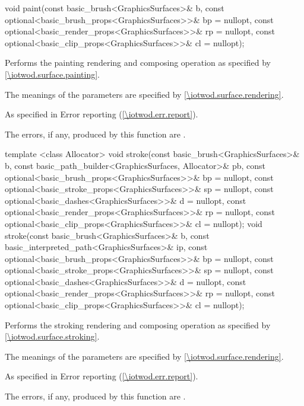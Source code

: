 %
\begin{itemdecl}
void paint(const basic_brush<GraphicsSurfaces>& b,
  const optional<basic_brush_props<GraphicsSurfaces>>& bp = nullopt,
  const optional<basic_render_props<GraphicsSurfaces>>& rp = nullopt,
  const optional<basic_clip_props<GraphicsSurfaces>>& cl = nullopt);
\end{itemdecl}
\begin{itemdescr}
\pnum
\effects
Performs the painting rendering and composing operation as specified by \ref{\iotwod.surface.painting}.

\pnum
The meanings of the parameters are specified by \ref{\iotwod.surface.rendering}.

\pnum
\throws
As specified in Error reporting (\ref{\iotwod.err.report}).

\pnum
\errors
The errors, if any, produced by this function are .
\end{itemdescr}

%
\begin{itemdecl}
template <class Allocator>
void stroke(const basic_brush<GraphicsSurfaces>& b,
  const basic_path_builder<GraphicsSurfaces, Allocator>& pb,
  const optional<basic_brush_props<GraphicsSurfaces>>& bp = nullopt,
  const optional<basic_stroke_props<GraphicsSurfaces>>& sp = nullopt,
  const optional<basic_dashes<GraphicsSurfaces>>& d = nullopt,
  const optional<basic_render_props<GraphicsSurfaces>>& rp = nullopt,
  const optional<basic_clip_props<GraphicsSurfaces>>& cl = nullopt);
void stroke(const basic_brush<GraphicsSurfaces>& b,
  const basic_interpreted_path<GraphicsSurfaces>& ip,
  const optional<basic_brush_props<GraphicsSurfaces>>& bp = nullopt,
  const optional<basic_stroke_props<GraphicsSurfaces>>& sp = nullopt,
  const optional<basic_dashes<GraphicsSurfaces>>& d = nullopt,
  const optional<basic_render_props<GraphicsSurfaces>>& rp = nullopt,
  const optional<basic_clip_props<GraphicsSurfaces>>& cl = nullopt);
\end{itemdecl}
\begin{itemdescr}
\pnum
\effects
Performs the stroking rendering and composing operation as specified by \ref{\iotwod.surface.stroking}.

\pnum
The meanings of the parameters are specified by \ref{\iotwod.surface.rendering}.

\pnum
\throws
As specified in Error reporting (\ref{\iotwod.err.report}).

\pnum
\errors
The errors, if any, produced by this function are .
\end{itemdescr}

